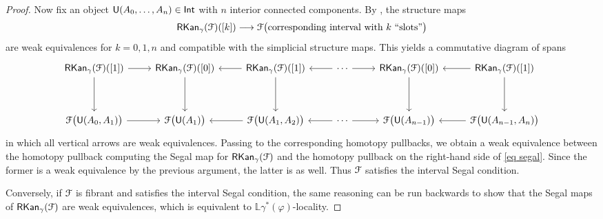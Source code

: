 \begin{proof}
    Now fix an object $\mathsf U(A_0,\ldots,A_n)\in \operatorname{\mathsf{Int}}$ with $n$ interior connected
    components. By , the
    structure maps
    \begin{equation}
      \operatorname{{\sf RKan}}_\gamma(\mathcal F)([k])
        \longrightarrow
      \mathcal F\big(\text{corresponding interval with $k$ ‘‘slots’’}\big)
    \end{equation}
    are weak equivalences for $k=0,1,n$ and compatible with the simplicial
    structure maps. This yields a commutative diagram of spans
    \begin{equation}
    \begin{tikzcd}[ampersand replacement=\&]
        {\rkan_{\gamma}(\cF)([1])} \& {\rkan_{\gamma}(\cF)([0])} \&
        {\rkan_{\gamma}(\cF)([1])} \& \cdots \&
        {\rkan_{\gamma}(\cF)([0])} \& {\rkan_{\gamma}(\cF)([1])} \\
        \\
        {\cF\big(\sU(A_0,A_1)\big)} \& {\cF\big(\sU(A_1)\big)} \&
        {\cF\big(\sU(A_1,A_2)\big)} \& \cdots \&
        {\cF\big(\sU(A_{n-1})\big)} \&
        {\cF\big(\sU(A_{n-1},A_{n})\big)}
        \arrow[from=1-1, to=1-2]
        \arrow[from=1-1, to=3-1]
        \arrow[from=1-2, to=3-2]
        \arrow[from=1-3, to=1-2]
        \arrow[from=1-3, to=3-3]
        \arrow[from=1-4, to=1-3]
        \arrow[from=1-4, to=1-5]
        \arrow[from=1-5, to=3-5]
        \arrow[from=1-6, to=1-5]
        \arrow[from=1-6, to=3-6]
        \arrow[from=3-1, to=3-2]
        \arrow[from=3-3, to=3-2]
        \arrow[from=3-4, to=3-3]
        \arrow[from=3-4, to=3-5]
        \arrow[from=3-6, to=3-5]
    \end{tikzcd}
    \end{equation}
    in which all vertical arrows are weak equivalences. Passing to the
    corresponding homotopy pullbacks, we obtain a weak equivalence between the
    homotopy pullback computing the Segal map for $\operatorname{{\sf RKan}}_\gamma(\mathcal F)$ and the
    homotopy pullback on the right-hand side of \eqref{eq segal}. Since the
    former is a weak equivalence by the previous argument, the latter is as
    well. Thus $\mathcal F$ satisfies the interval Segal condition.

    Conversely, if $\mathcal F$ is fibrant and satisfies the interval Segal condition,
    the same reasoning can be run backwards to show that the Segal maps of
    $\operatorname{{\sf RKan}}_\gamma(\mathcal F)$ are weak equivalences, which is equivalent to
    $\mathbb{L}\gamma^*(\varphi)$-locality.
\end{proof}


